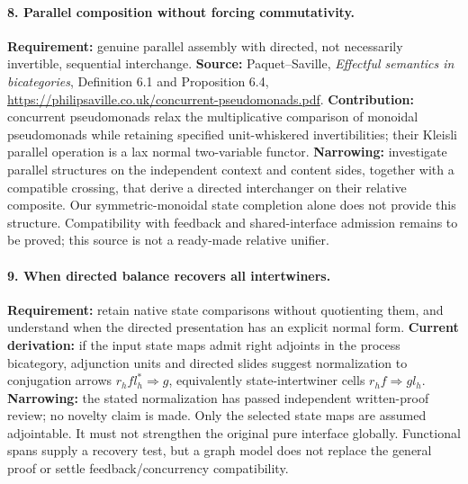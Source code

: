 \documentclass[11pt]{article}
\begin{document}
\paragraph{8. Parallel composition without forcing commutativity.}
\textbf{Requirement:} genuine parallel assembly with directed, not necessarily invertible, sequential interchange.\newline
\textbf{Source:} Paquet--Saville, \emph{Effectful semantics in bicategories}, Definition 6.1 and Proposition 6.4, \url{https://philipsaville.co.uk/concurrent-pseudomonads.pdf}.\newline
\textbf{Contribution:} concurrent pseudomonads relax the multiplicative comparison of monoidal pseudomonads while retaining specified unit-whiskered invertibilities; their Kleisli parallel operation is a lax normal two-variable functor.\newline
\textbf{Narrowing:} investigate parallel structures on the independent context and content sides, together with a compatible crossing, that derive a directed interchanger on their relative composite. Our symmetric-monoidal state completion alone does not provide this structure. Compatibility with feedback and shared-interface admission remains to be proved; this source is not a ready-made relative unifier.

\paragraph{9. When directed balance recovers all intertwiners.}
\textbf{Requirement:} retain native state comparisons without quotienting them, and understand when the directed presentation has an explicit normal form.\newline
\textbf{Current derivation:} if the input state maps admit right adjoints in the process bicategory, adjunction units and directed slides suggest normalization to conjugation arrows $r_h f l_h^*\Rightarrow g$, equivalently state-intertwiner cells $r_hf\Rightarrow gl_h$.\newline
\textbf{Narrowing:} the stated normalization has passed independent written-proof review; no novelty claim is made. Only the selected state maps are assumed adjointable. It must not strengthen the original pure interface globally. Functional spans supply a recovery test, but a graph model does not replace the general proof or settle feedback/concurrency compatibility.
\end{document}

